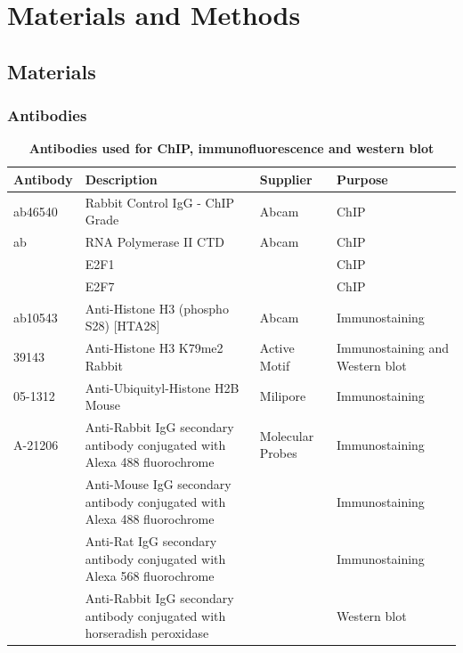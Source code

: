 \documentclass[11pt,twoside,a4paper]{report}
\begin{document}
\clearpage

\chapter{Materials and Methods}
	\section{Materials}
		\subsection{Antibodies}
			\begin{table}[H]
       		\caption{\bf{Antibodies used for ChIP, immunofluorescence and western blot}}
        		\begin{center}
            		\begin{tabular}{p{2cm} | p{8cm} | p{3cm} | p{3cm}}
	                	\textbf{Antibody} & \textbf{Description} & \textbf{Supplier} & \textbf{Purpose}\\
    		            \hline
        		        ab46540 & Rabbit Control IgG - ChIP Grade & Abcam & ChIP\\
            		    ab & RNA Polymerase II CTD & Abcam & ChIP\\
            		     & E2F1 & & ChIP\\
						 & E2F7 & & ChIP\\
            		    ab10543 & Anti-Histone H3 (phospho S28) [HTA28] & Abcam & Immunostaining\\
            		    39143  & Anti-Histone H3 K79me2 Rabbit & Active Motif & Immunostaining and Western blot\\
            		    05-1312  &  Anti-Ubiquityl-Histone H2B Mouse & Milipore & Immunostaining\\
            		    \hline
            		    A-21206 & Anti-Rabbit IgG secondary antibody conjugated with Alexa 488 fluorochrome &  Molecular Probes & Immunostaining\\
               		    & Anti-Mouse IgG secondary antibody conjugated with Alexa 488  fluorochrome &  & Immunostaining\\
            		    & Anti-Rat IgG secondary antibody conjugated with Alexa 568 fluorochrome & & Immunostaining\\
            		    & Anti-Rabbit IgG secondary antibody conjugated with horseradish peroxidase &  & Western blot\\
	            	\end{tabular}
    		    \end{center}
		    \end{table}
		  
\end{document}
